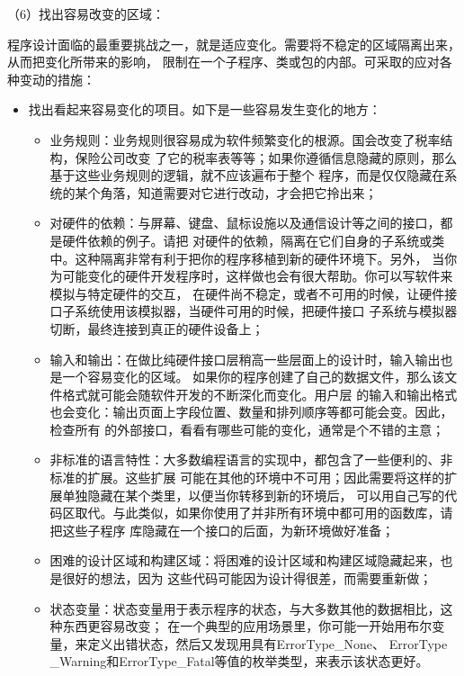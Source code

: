 \documentclass{article}
\begin{document}
\par
（6）找出容易改变的区域：
\par
程序设计面临的最重要挑战之一，就是适应变化。需要将不稳定的区域隔离出来，从而把变化所带来的影响，
限制在一个子程序、类或包的内部。可采取的应对各种变动的措施：
\begin{itemize}
    \item 找出看起来容易变化的项目。如下是一些容易发生变化的地方：
    \begin{itemize}
        \item 业务规则：业务规则很容易成为软件频繁变化的根源。国会改变了税率结构，保险公司改变
        了它的税率表等等；如果你遵循信息隐藏的原则，那么基于这些业务规则的逻辑，就不应该遍布于整个
        程序，而是仅仅隐藏在系统的某个角落，知道需要对它进行改动，才会把它拎出来；
        \item 对硬件的依赖：与屏幕、键盘、鼠标设施以及通信设计等之间的接口，都是硬件依赖的例子。请把
        对硬件的依赖，隔离在它们自身的子系统或类中。这种隔离非常有利于把你的程序移植到新的硬件环境下。另外，
        当你为可能变化的硬件开发程序时，这样做也会有很大帮助。你可以写软件来模拟与特定硬件的交互，
        在硬件尚不稳定，或者不可用的时候，让硬件接口子系统使用该模拟器，当硬件可用的时候，把硬件接口
        子系统与模拟器切断，最终连接到真正的硬件设备上；
        \item 输入和输出：在做比纯硬件接口层稍高一些层面上的设计时，输入输出也是一个容易变化的区域。
        如果你的程序创建了自己的数据文件，那么该文件格式就可能会随软件开发的不断深化而变化。用户层
        的输入和输出格式也会变化：输出页面上字段位置、数量和排列顺序等都可能会变。因此，检查所有
        的外部接口，看看有哪些可能的变化，通常是个不错的主意；
        \item 非标准的语言特性：大多数编程语言的实现中，都包含了一些便利的、非标准的扩展。这些扩展
        可能在其他的环境中不可用；因此需要将这样的扩展单独隐藏在某个类里，以便当你转移到新的环境后，
        可以用自己写的代码区取代。与此类似，如果你使用了并非所有环境中都可用的函数库，请把这些子程序
        库隐藏在一个接口的后面，为新环境做好准备；
        \item 困难的设计区域和构建区域：将困难的设计区域和构建区域隐藏起来，也是很好的想法，因为
        这些代码可能因为设计得很差，而需要重新做；
        \item 状态变量：状态变量用于表示程序的状态，与大多数其他的数据相比，这种东西更容易改变；
        在一个典型的应用场景里，你可能一开始用布尔变量，来定义出错状态，然后又发现用具有ErrorType\_None、
        ErrorType \_Warning和ErrorType\_Fatal等值的枚举类型，来表示该状态更好。

\end{itemize}
\end{itemize}
\end{document}

